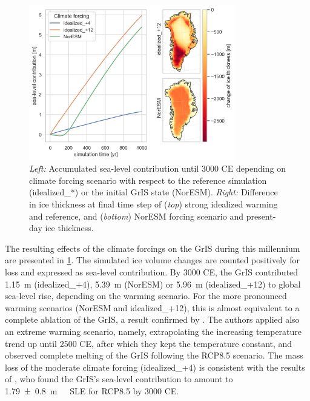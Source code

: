 \begin{figure}
	\centering
	\includegraphics[width=0.8\textwidth]{../global-warming/figs/sea-level-contribution.png}
	\caption{\textit{Left:} Accumulated sea-level contribution until 3000 CE depending on climate forcing scenario with respect to the reference simulation (idealized\_*) or the initial GrIS state (NorESM). \textit{Right:} Difference in ice thickness at final time step of (\textit{top}) strong idealized warming and reference, and (\textit{bottom}) NorESM forcing scenario and present-day ice thickness.}
	\label{fig:warming-sea-level}
\end{figure}

The resulting effects of the climate forcings on the GrIS during this millennium are presented in \cref{fig:warming-sea-level}. The simulated ice volume changes are counted positively for loss and expressed as sea-level contribution. By 3000 CE, the GrIS contributed \SI{1.15}{\m} (idealized\_+4), \SI{5.39}{\m} (NorESM) or \SI{5.96}{\m} (idealized\_+12) to global sea-level rise, depending on the warming scenario. For the more pronounced warming scenarios (NorESM and idealized\_+12), this is almost equivalent to a complete ablation of the GrIS, a result confirmed by \textcite{aschwanden2019}. The authors applied also an extreme warming scenario, namely, extrapolating the increasing temperature trend up until 2500 CE, after which they kept the temperature constant, and observed complete melting of the GrIS following the RCP8.5 scenario. The mass loss of the moderate climate forcing (idealized\_+4) is consistent with the results of \textcite{greve2022}, who found the GrIS's sea-level contribution to amount to \SI{1.79 +- 0.8}{\m\ SLE} for RCP8.5 by 3000 CE.

